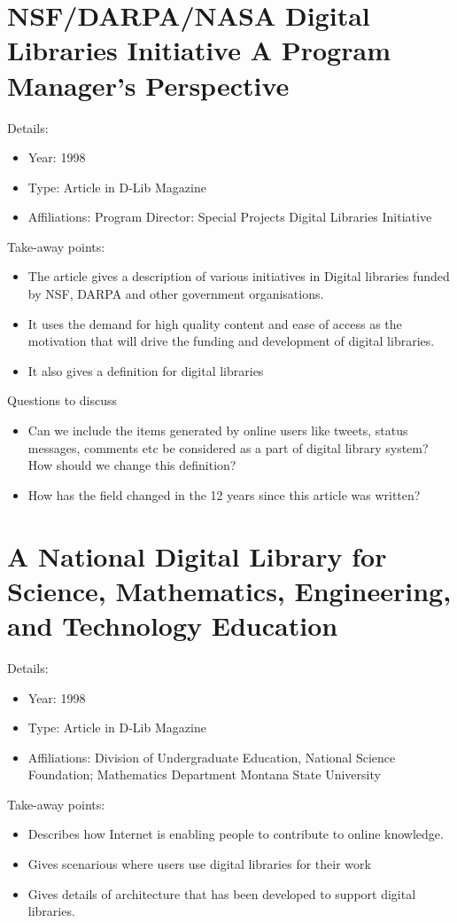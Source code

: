 \documentclass[12pt, onecolumn]{IEEEtran}
\begin{document}
\section{NSF/DARPA/NASA Digital Libraries Initiative A Program Manager's
Perspective \cite{dlprogram}} \noindent Details:
\begin{itemize}
  \item Year: 1998
  \item Type: Article in D-Lib Magazine
  \item Affiliations: Program Director: Special Projects Digital Libraries Initiative
\end{itemize}
\medskip
Take-away points:
\begin{itemize}
  \item The article gives a description of various initiatives in Digital
  libraries funded by NSF, DARPA and other government organisations.
  \item It uses the demand for high quality content and ease of access as the
  motivation that will drive the funding and development of digital libraries.
  \item It also gives a definition for digital libraries
\end{itemize}
	
\noindent Questions to discuss
\begin{itemize}
  \item Can we include the items generated by online users like tweets,
  status messages, comments etc be considered as a part of digital library
  system? How should we change this definition?
  \item How has the field changed in the 12 years since this article was
  written?
\end{itemize}
\bigskip\bigskip

\section{A National Digital Library for Science, Mathematics, Engineering, and
Technology Education \cite{dlstem}} \noindent Details:
\begin{itemize}
  \item Year: 1998
  \item Type: Article in D-Lib Magazine
  \item Affiliations: Division of Undergraduate Education, National Science
  Foundation; Mathematics Department Montana State University
\end{itemize}
\medskip
Take-away points:
\begin{itemize}
  \item Describes how Internet is enabling people to contribute to online
  knowledge.
  \item Gives scenarious where users use digital libraries for their work
  \item Gives details of architecture that has been developed to support digital
  libraries.
\end{itemize}
	
\end{document}
